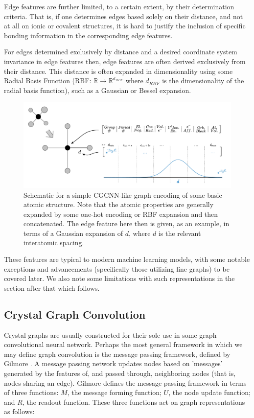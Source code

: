 \documentclass[10pt,a4paper]{article}
\begin{document}
Edge features are further limited, to a certain extent, by their determination criteria. That is, if one determines edges based solely on their distance, and not at all on ionic or covalent structures, it is hard to justify the inclusion of specific bonding information in the corresponding edge features. 

For edges determined exclusively by distance and a desired coordinate system invariance in edge features then, edge features are often derived exclusively from their distance. This distance is often expanded in dimensionality using some Radial Basis Function (RBF: $\mathbb{R}\rightarrow\mathbb{R}^{d_{RBF}}$ where $d_{RBF}$ is the dimensionality of the radial basis function), such as a Gaussian or Bessel expansion.


\begin{figure}

\begin{center}
\includegraphics[scale=0.5]{crystal_graph_feat.pdf}
\end{center}

\caption{Schematic for a simple CGCNN-like graph encoding of some basic atomic structure. Note that the atomic properties are generally expanded by some one-hot encoding or RBF expansion and then concatenated. The edge feature here then is given, as an example, in terms of a Gaussian expansion of $d$, where $d$ is the relevant interatomic spacing.}
\end{figure}
These features are typical to modern machine learning models, with some notable exceptions and advancements (specifically those utilizing line graphs) to be covered later. We also note some limitations with such representations in the section after that which follows.

\subsection{Crystal Graph Convolution}
Crystal graphs are usually constructed for their sole use in some graph convolutional neural network. Perhaps the most general framework in which we may define graph convolution is the message passing framework, defined by Gilmore \cite{mpnn}.
A message passing network updates nodes based on 'messages' generated by the features of, and passed through, neighboring nodes (that is, nodes sharing an edge). Gilmore defines the message passing framework in terms of three functions: $M$, the message forming function; $U$, the node update function; and $R$, the readout function. These three functions act on graph representations as follows:
\end{document}
